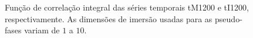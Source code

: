 \begin{figure}[ht]
\centering {}
\caption{Função de correlação integral das séries temporais tM1200 e tI1200, respectivamente. As dimensões de imersão usadas para as pseudo-fases variam de $1$ a $10$.}
\label{figcorrintMI0681200}
\end{figure}


